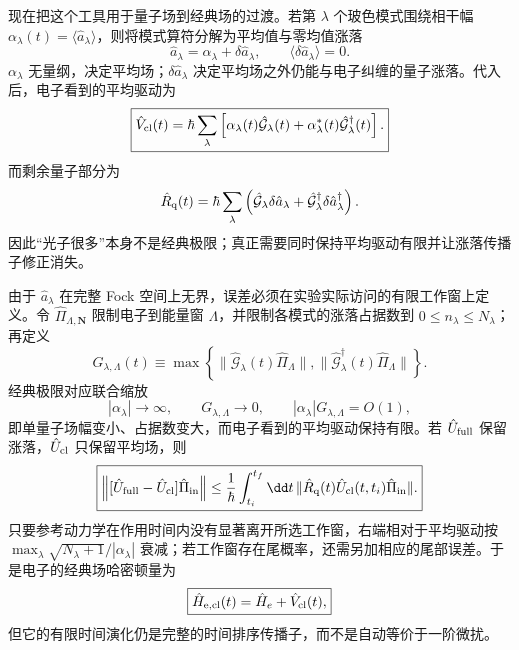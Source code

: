 现在把这个工具用于量子场到经典场的过渡。若第 $\lambda$ 个玻色模式围绕相干幅 $\alpha_\lambda(t)=\langle\hat a_\lambda\rangle$，则将模式算符分解为平均值与零均值涨落
\[
\hat a_\lambda=\alpha_\lambda+\delta\hat a_\lambda,
\qquad
\langle\delta\hat a_\lambda\rangle=0.
\]
$\alpha_\lambda$ 无量纲，决定平均场；$\delta\hat a_\lambda$ 决定平均场之外仍能与电子纠缠的量子涨落。代入 后，电子看到的平均驱动为
\begin{equation}
\boxed{
\hat V_{\rm cl}(t)
=\hbar\sum_\lambda
\left[
\alpha_\lambda(t)\hat{\mathcal G}_\lambda(t)
+\alpha_\lambda^*(t)\hat{\mathcal G}_\lambda^\dagger(t)
\right].}
\label{eq:multimode_classical_drive_operator}
\end{equation}
而剩余量子部分为
\[
\hat R_{\rm q}(t)
=\hbar\sum_\lambda
\left(
\hat{\mathcal G}_\lambda\delta\hat a_\lambda
+\hat{\mathcal G}_\lambda^\dagger\delta\hat a_\lambda^\dagger
\right).
\]
因此“光子很多”本身不是经典极限；真正需要同时保持平均驱动有限并让涨落传播子修正消失。

由于 $\hat a_\lambda$ 在完整 Fock 空间上无界，误差必须在实验实际访问的有限工作窗上定义。令 $\hat\Pi_{\Lambda,\mathbf N}$ 限制电子到能量窗 $\Lambda$，并限制各模式的涨落占据数到 $0\le n_\lambda\le N_\lambda$；再定义
\[
G_{\lambda,\Lambda}(t)
\equiv
\max\!\left\{\|\hat{\mathcal G}_\lambda(t)\hat\Pi_\Lambda\|,
\|\hat{\mathcal G}_\lambda^\dagger(t)\hat\Pi_\Lambda\|\right\}.
\]
经典极限对应联合缩放
\begin{equation}
\boxed{
|\alpha_\lambda|\to\infty,
\qquad
G_{\lambda,\Lambda}\to0,
\qquad
|\alpha_\lambda|G_{\lambda,\Lambda}=O(1),}
\label{eq:multimode_coherent_classical_scaling}
\end{equation}
即单量子场幅变小、占据数变大，而电子看到的平均驱动保持有限。若 $\hat U_{\rm full}$ 保留涨落，$\hat U_{\rm cl}$ 只保留平均场，则
\begin{equation}
\boxed{
\left\|[\hat U_{\rm full}-\hat U_{\rm cl}]\hat\Pi_{\rm in}\right\|
\le
\frac1\hbar\int_{t_i}^{t_f}\dd t\,
\|\hat R_{\rm q}(t)\hat U_{\rm cl}(t,t_i)\hat\Pi_{\rm in}\|.}
\label{eq:multimode_classical_limit_duhamel_bound}
\end{equation}
只要参考动力学在作用时间内没有显著离开所选工作窗，右端相对于平均驱动按 $\max_\lambda\sqrt{N_\lambda+1}/|\alpha_\lambda|$ 衰减；若工作窗存在尾概率，还需另加相应的尾部误差。于是电子的经典场哈密顿量为
\begin{equation}
\boxed{
\hat H_{\rm e,cl}(t)=\hat H_e+\hat V_{\rm cl}(t),}
\label{eq:general_classical_field_limit_electron_hamiltonian}
\end{equation}
但它的有限时间演化仍是完整的时间排序传播子，而不是自动等价于一阶微扰。


